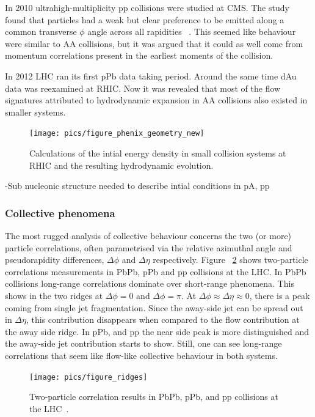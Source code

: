 In 2010 ultrahigh-multiplicity pp collisions were studied at CMS. The study found that particles had a weak but clear preference to be emitted along a common transverse $\phi$ angle across all rapidities ~\cite{Salgado:2016jws}. This seemed like behaviour were similar to AA collisions, but it was argued that it could as well come from momentum correlations present in the earliest moments of the collision.

In 2012 LHC ran its first pPb data taking period. Around the same time dAu data was reexamined at RHIC. Now it was revealed that most of the flow signatures attributed to hydrodynamic expansion in AA collisions also existed in smaller systems.
\begin{figure}[b!]
\centering
            	\texttt{[image: pics/figure\_phenix\_geometry\_new]}
                \caption{Calculations of the intial energy density in small collision systems at RHIC and the resulting hydrodynamic evolution.}
	\label{fig:smallsystems1}
\end{figure}



-Sub nucleonic structure needed to describe intial conditions in pA, pp
\subsubsection{Collective phenomena}
The most rugged analysis of collective behaviour concerns the two (or more) particle correlations, often parametrised via the relative azimuthal angle and pseudorapidity differences, $\Delta \phi$ and $\Delta \eta$ respectively. Figure ~\ref{fig:smallsystems2} shows two-particle correlations measurements in PbPb, pPb and pp collisions at the LHC. In PbPb collisions long-range correlations dominate over short-range phenomena. This shows in the two ridges at $\Delta \phi = 0 $ and $\Delta \phi = \pi$. At $\Delta\phi\approx\Delta\eta\approx0$, there is a peak coming from single jet fragmentation. Since the away-side jet can be spread out in $\Delta\eta$, this contribution disappears when compared to the flow contribution at the away side ridge. In pPb, and pp the near side peak is more distinguished and the away-side jet contribution starts to show. Still, one can see long-range correlations that seem like flow-like collective behaviour in both systems. 
\begin{figure}[b!]
\centering
            	\texttt{[image: pics/figure\_ridges]}
                \caption{Two-particle correlation results in PbPb, pPb, and pp collisions at the LHC~\cite{}. }
	\label{fig:smallsystems2}
\end{figure}

